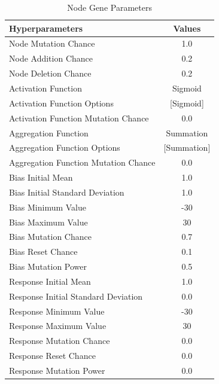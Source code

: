 \documentclass[letterpaper, 12pt]{article}
\begin{document}
\begin{table}[H]
\centering
\caption{Node Gene Parameters}
\label{table:node_params}
\begin{NiceTabular}{X|c}
\toprule
\textbf{Hyperparameters} & \textbf{Values} \\
\midrule
Node Mutation Chance & 1.0 \\
Node Addition Chance & 0.2 \\
Node Deletion Chance & 0.2 \\

Activation Function & Sigmoid \\
Activation Function Options & [Sigmoid] \\
Activation Function Mutation Chance & 0.0 \\

Aggregation Function & Summation \\
Aggregation Function Options & [Summation] \\
Aggregation Function Mutation Chance & 0.0 \\

Bias Initial Mean & 1.0 \\
Bias Initial Standard Deviation & 1.0 \\
Bias Minimum Value & -30 \\
Bias Maximum Value & 30 \\
Bias Mutation Chance & 0.7 \\
Bias Reset Chance & 0.1 \\
Bias Mutation Power & 0.5 \\

Response Initial Mean & 1.0 \\
Response Initial Standard Deviation & 0.0 \\
Response Minimum Value & -30 \\
Response Maximum Value & 30 \\
Response Mutation Chance & 0.0 \\
Response Reset Chance & 0.0 \\
Response Mutation Power & 0.0 \\
\bottomrule
\end{NiceTabular}
\end{table}
\end{document}
